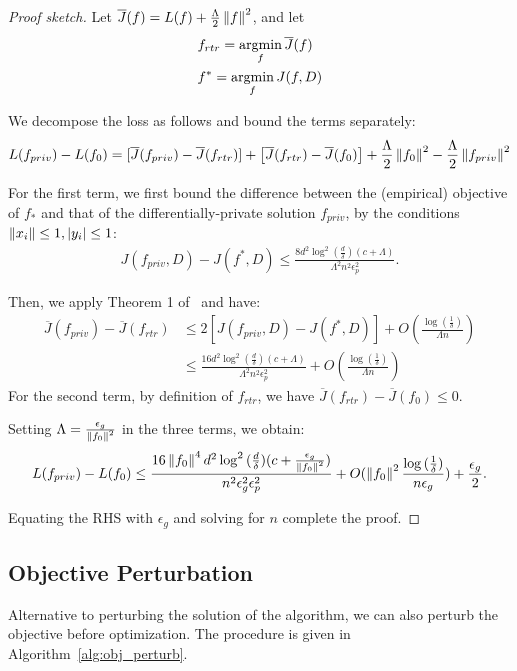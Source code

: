 \documentclass{article} %
\begin{document}
\begin{proof}[Proof sketch]
Let $\overline{J}(f) = L(f) + \frac{\Lambda}{2} \left\lVert f\right\rVert^2$, and let \begin{align*}
& f_{rtr} = \operatorname*{argmin}_f \overline{J}(f)\\
& f^* = \operatorname*{argmin}_f J(f, D)
\end{align*}

We decompose the loss as follows and bound the terms separately:
\begin{align*}
L(f_{priv}) -  L(f_0) = [\overline{J}(f_{priv}) - \overline{J}(f_{rtr})] + \left[\overline{J}(f_{rtr}) - \overline{J}(f_0)\right] + \frac{\Lambda}{2} \left\lVert f_0\right\rVert^2 - \frac{\Lambda}{2} \left\lVert f_{priv}\right\rVert^2
\end{align*}

For the first term, we first bound the difference between the (empirical) objective of $f_*$ and that of the differentially-private solution $f_{priv}$, by the conditions $\left\lVert x_i\right\rVert \le 1, \left\lvert y_i\right\rvert \le 1$:
\begin{align}
J(f_{priv}, D) - J(f^*, D) \le \frac{8d^2\log^2{(\frac{d}{\delta})} (c + \Lambda)}{\Lambda^2 n^2 \epsilon_p^2}.\label{thm15:emp}
\end{align}

Then, we apply Theorem 1 of~\cite{sridharan2008objective} and have:
\begin{align*}
\overline{J}(f_{priv}) - \overline{J}(f_{rtr}) & \le 2 [J(f_{priv}, D) - J(f^*, D)] + O(\frac{\log{(\frac{1}{\delta})}}{\Lambda n})\\
& \le  \frac{16d^2\log^2{(\frac{d}{\delta})} (c + \Lambda)}{\Lambda^2 n^2 \epsilon_p^2} + O(\frac{\log{(\frac{1}{\delta})}}{\Lambda n})
\end{align*}
For the second term, by definition of $f_{rtr}$, we have $\overline{J}(f_{rtr}) - \overline{J}(f_0) \le 0$.

Setting $\Lambda = \frac{\epsilon_g}{\left\lVert f_0\right\rVert^2}$ in the three terms, we obtain:
\begin{align*}
L(f_{priv}) - L(f_0) \le  \frac{16\left\lVert f_0\right\rVert^4 d^2\log^2{(\frac{d}{\delta})} (c +\frac{\epsilon_g}{\left\lVert f_0\right\rVert^2})}{n^2 \epsilon_g^2\epsilon_p^2} + O(\left\lVert f_0\right\rVert^2\frac{\log{(\frac{1}{\delta})}}{n\epsilon_g}) + \frac{\epsilon_g}{2}.
\end{align*}

Equating the RHS with $\epsilon_g$ and solving for $n$ complete the proof.
\end{proof}

\subsection{Objective Perturbation}
Alternative to perturbing the solution of the algorithm, we can also perturb the objective before optimization. The procedure is given in Algorithm~\ref{alg:obj_perturb}.
\end{document}
